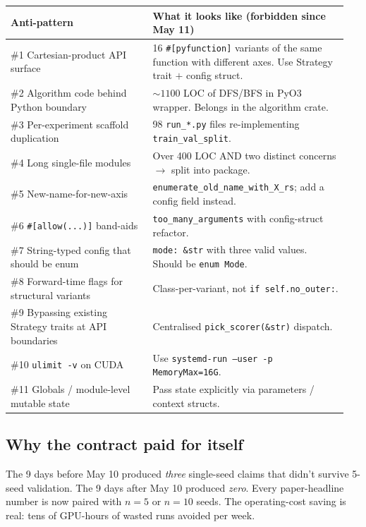 \documentclass[11pt,a4paper]{article}
\theoremstyle{plain}
\theoremstyle{definition}
\newcommand{\code}[1]{\texttt{\small #1}}
\begin{document}
\begin{center}\footnotesize
\begin{tabular}{p{0.40\linewidth} p{0.55\linewidth}}
\toprule
Anti-pattern & What it looks like (forbidden since May 11) \\
\midrule
\#1 Cartesian-product API surface       & 16 \code{\#[pyfunction]} variants of the same function with different axes. Use Strategy trait $+$ config struct. \\
\#2 Algorithm code behind Python boundary & $\sim 1100$ LOC of DFS/BFS in PyO3 wrapper. Belongs in the algorithm crate. \\
\#3 Per-experiment scaffold duplication & 98 \code{run\_*.py} files re-implementing \code{train\_val\_split}. \\
\#4 Long single-file modules            & Over 400 LOC AND two distinct concerns $\to$ split into package. \\
\#5 New-name-for-new-axis               & \code{enumerate\_old\_name\_with\_X\_rs}; add a config field instead. \\
\#6 \code{\#[allow(...)]} band-aids     & \code{too\_many\_arguments} with config-struct refactor. \\
\#7 String-typed config that should be enum & \code{mode: \&str} with three valid values. Should be \code{enum Mode}. \\
\#8 Forward-time flags for structural variants & Class-per-variant, not \code{if self.no\_outer:}. \\
\#9 Bypassing existing Strategy traits at API boundaries & Centralised \code{pick\_scorer(\&str)} dispatch. \\
\#10 \code{ulimit -v} on CUDA           & Use \code{systemd-run --user -p MemoryMax=16G}. \\
\#11 Globals / module-level mutable state & Pass state explicitly via parameters / context structs. \\
\bottomrule
\end{tabular}
\end{center}

\subsection{Why the contract paid for itself}

The 9 days before May 10 produced \emph{three} single-seed claims
that didn't survive 5-seed validation. The 9 days after May 10
produced \emph{zero}. Every paper-headline number is now paired
with $n{=}5$ or $n{=}10$ seeds. The operating-cost saving is
real: tens of GPU-hours of wasted runs avoided per week.
\end{document}
